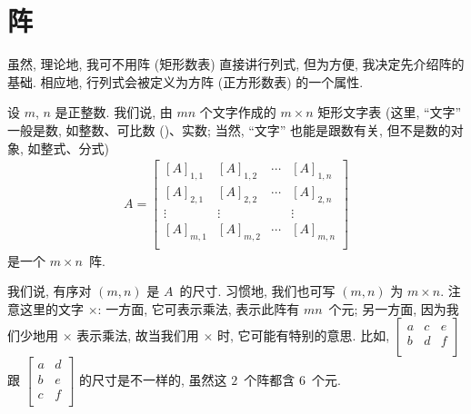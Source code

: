 \documentclass[../libro.tex]{subfiles}
\begin{document}

\section{阵}

虽然, 理论地, 我可不用阵 (矩形数表)
直接讲行列式,
但为方便, 我决定先介绍阵的基础.
相应地, 行列式会被定义为方阵
(正方形数表)
的一个属性.

\begin{definition}[阵]
    设 \(m\), \(n\) 是正整数.
    我们说,
    由 \(mn\) 个文字作成的 \(m \times n\) 矩形文字表
    (这里, ``文字'' 一般是数, %
    如整数、可比数 ()、实数;
    当然, ``文字'' 也能是跟数有关, 但不是数的对象,
    如整式、分式) %
    \begin{align*}
        A =
        \begin{bmatrix}
            [A]_{1,1} & [A]_{1,2} & \cdots & [A]_{1,n} \\
            [A]_{2,1} & [A]_{2,2} & \cdots & [A]_{2,n} \\
            \vdots    & \vdots    & {}     & \vdots    \\
            [A]_{m,1} & [A]_{m,2} & \cdots & [A]_{m,n} \\
        \end{bmatrix}
    \end{align*}
    是一个 \(m \times n\)~阵.

    我们说, 有序对 \((m, n)\) 是 \(A\)~的尺寸.
    习惯地, 我们也可写 \((m, n)\) 为 \(m \times n\).
    注意这里的文字 \(\times\):
    一方面, 它可表示乘法, 表示此阵有 \(mn\)~个元;
    另一方面, 因为我们少地用 \(\times\) 表示乘法,
    故当我们用 \(\times\) 时,
    它可能有特别的意思.
    比如,
    \(
        \begin{bmatrix}
            a & c & e \\
            b & d & f \\
        \end{bmatrix}
    \)
    跟
    \(
        \begin{bmatrix}
            a & d \\
            b & e \\
            c & f \\
        \end{bmatrix}
    \)
    的尺寸是不一样的,
    虽然这 \(2\)~个阵都含 \(6\)~个元.


\end{definition}
\end{document}
